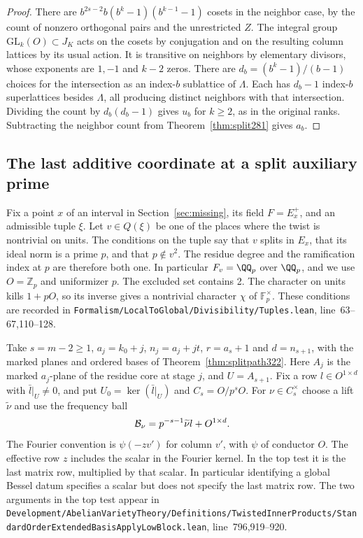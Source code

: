 \documentclass[a4paper,11pt]{article}
\theoremstyle{definition}
\theoremstyle{remark}
\newcommand{\ZZ}{\mathbb Z}\newcommand{\ord}{\operatorname{ord}}
\newcommand{\srcloc}[2]{{\small\nolinkurl{#1.lean}}, line~#2}
\numberwithin{equation}{section}
\begin{document}
\begin{proof}
There are \(b^{2s-2}b(b^k-1)(b^{k-1}-1)\) cosets in
the neighbor case, by the count of nonzero orthogonal pairs
and the unrestricted \(Z\). The integral group
\(\mathrm{GL}_k(O)\subset J_K\) acts on the cosets by
conjugation and on the resulting column lattices by its
usual action. It is transitive on neighbors by elementary
divisors, whose exponents are \(1,-1\) and \(k-2\) zeros.
There are \(d_b=(b^k-1)/(b-1)\) choices for the intersection
as an index-\(b\) sublattice of \(\Lambda\). Each has
\(d_b-1\) index-\(b\) superlattices besides \(\Lambda\),
all producing distinct neighbors with that intersection.
Dividing the count by \(d_b(d_b-1)\) gives \(u_b\)
for \(k\ge2\), as in the original ranks. Subtracting the
neighbor count from Theorem~\ref{thm:split281} gives \(a_b\).
\end{proof}

\subsection{The last additive coordinate at a split auxiliary prime}\label{sec:signedfibers331}
Fix a point \(x\) of an interval in Section~\ref{sec:missing}, its field
\(F=E_x^+\), and an admissible tuple \(\xi\). Let \(v\in Q(\xi)\) be
one of the places where the twist is nontrivial on units. The conditions
on the tuple say that \(v\) splits in \(E_x\), that its ideal norm is a
prime \(p\), and that \(p\notin v^2\). The residue degree and the
ramification index at \(p\) are therefore both one. In particular
\(F_v=\QQ_p\) over \(\QQ_p\), and we use \(O=\ZZ_p\) and uniformizer
\(p\). The excluded set contains 2. The character on units kills
\(1+pO\), so its inverse gives a nontrivial character \(\chi\) of
\(\mathbb F_p^\times\). These conditions are recorded in
\srcloc{Formalism/LocalToGlobal/Divisibility/Tuples}{63--67,110--128}.

Take \(s=m-2\ge1\), \(a_j=k_0+j\), \(n_j=a_j+jt\),
\(r=a_s+1\) and \(d=n_{s+1}\), with the marked planes and ordered
bases of Theorem~\ref{thm:splitpath322}. Here \(A_j\) is the marked
\(a_j\)-plane of the residue core at stage \(j\), and \(U=A_{s+1}\).
Fix a row \(l\in O^{1\times d}\) with \(\bar l|_U\ne0\), and put
\(U_0=\ker(\bar l|_U)\) and \(C_s=O/p^sO\). For \(\nu\in C_s^\times\)
choose a lift \(\widetilde\nu\) and use the frequency ball
\[
       {\cal B}_\nu=p^{-s-1}\widetilde\nu l+O^{1\times d}.
\]
The Fourier convention is \(\psi(-zv')\) for column \(v'\), with
\(\psi\) of conductor \(O\). The effective row \(z\) includes the scalar
in the Fourier kernel. In the top test it is the last matrix row,
multiplied by that scalar. In particular identifying a global Bessel
datum specifies a scalar but does not specify the last matrix row.
The two arguments in the top test appear in
\srcloc{Development/AbelianVarietyTheory/Definitions/TwistedInnerProducts/StandardOrderExtendedBasisApplyLowBlock}{796,919--920}.
\end{document}
